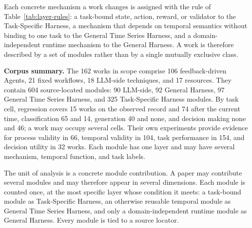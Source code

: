 \documentclass[preprints,article,submit,moreauthors]{Definitions/mdpi}
\begin{document}
Each concrete mechanism a work changes is assigned with the rule of Table~\ref{tab:layer-rules}: a task-bound state, action, reward, or validator to the Task-Specific Harness, a mechanism that depends on temporal semantics without binding to one task to the General Time Series Harness, and a domain-independent runtime mechanism to the General Harness. A work is therefore described by a set of modules rather than by a single mutually exclusive class.

\begin{tcolorbox}[
  colback=surveyCard,
  colframe=surveyBlue!40!black,
  boxrule=0.6pt,
  arc=4pt,
  left=8pt,
  right=8pt,
  top=6pt,
  bottom=6pt
]
\small
\noindent\textbf{Corpus summary.} The 162 works in scope comprise 106 feedback-driven Agents, 21 fixed workflows, 18 LLM-side techniques, and 17 resources. They contain 604 source-located modules: 90 LLM-side, 92 General Harness, 97 General Time Series Harness, and 325 Task-Specific Harness modules. By task cell, regression covers 15 works on the observed record and 74 after the current time, classification 65 and 14, generation 40 and none, and decision making none and 46; a work may occupy several cells. Their own experiments provide evidence for process validity in 66, temporal validity in 104, task performance in 154, and decision utility in 32 works. Each module has one layer and may have several mechanism, temporal function, and task labels.
\end{tcolorbox}

The unit of analysis is a concrete module contribution. A paper may contribute several modules and may therefore appear in several dimensions. Each module is counted once, at the most specific layer whose condition it meets: a task-bound module as Task-Specific Harness, an otherwise reusable temporal module as General Time Series Harness, and only a domain-independent runtime module as General Harness. Every module is tied to a source locator.
\end{document}
